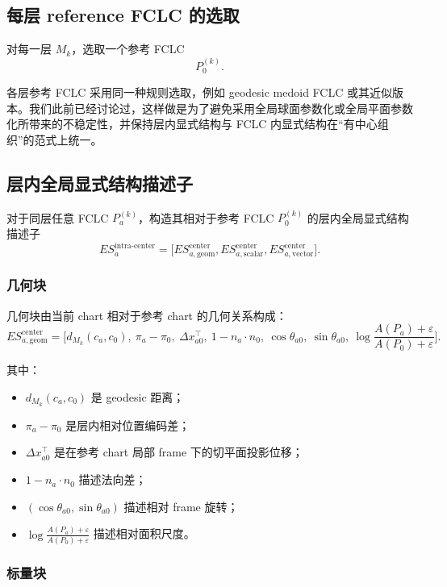 \documentclass[12pt,a4paper]{ctexart}
\begin{document}
\subsection{每层 reference FCLC 的选取}

对每一层 \(M_k\)，选取一个参考 FCLC
\[
P_0^{(k)}.
\]

各层参考 FCLC 采用同一种规则选取，例如 geodesic medoid FCLC 或其近似版本。我们此前已经讨论过，这样做是为了避免采用全局球面参数化或全局平面参数化所带来的不稳定性，并保持层内显式结构与 FCLC 内显式结构在“有中心组织”的范式上统一。

\subsection{层内全局显式结构描述子}

对于同层任意 FCLC \(P_a^{(k)}\)，构造其相对于参考 FCLC \(P_0^{(k)}\) 的层内全局显式结构描述子
\[
ES_a^{\mathrm{intra\text{-}center}}
=
\big[
ES_{a,\mathrm{geom}}^{\mathrm{center}},
ES_{a,\mathrm{scalar}}^{\mathrm{center}},
ES_{a,\mathrm{vector}}^{\mathrm{center}}
\big].
\]

\subsubsection{几何块}

几何块由当前 chart 相对于参考 chart 的几何关系构成：
\[
ES_{a,\mathrm{geom}}^{\mathrm{center}}
=
\big[
d_{M_k}(c_a,c_0),\
\pi_a-\pi_0,\
\Delta x_{a0}^{\top},\
1-n_a\cdot n_0,\
\cos\theta_{a0},\
\sin\theta_{a0},\
\log\frac{A(P_a)+\varepsilon}{A(P_0)+\varepsilon}
\big].
\]

其中：
\begin{itemize}[leftmargin=2em]
    \item \(d_{M_k}(c_a,c_0)\) 是 geodesic 距离；
    \item \(\pi_a-\pi_0\) 是层内相对位置编码差；
    \item \(\Delta x_{a0}^{\top}\) 是在参考 chart 局部 frame 下的切平面投影位移；
    \item \(1-n_a\cdot n_0\) 描述法向差；
    \item \((\cos\theta_{a0},\sin\theta_{a0})\) 描述相对 frame 旋转；
    \item \(\log\frac{A(P_a)+\varepsilon}{A(P_0)+\varepsilon}\) 描述相对面积尺度。
\end{itemize}

\subsubsection{标量块}
\end{document}
